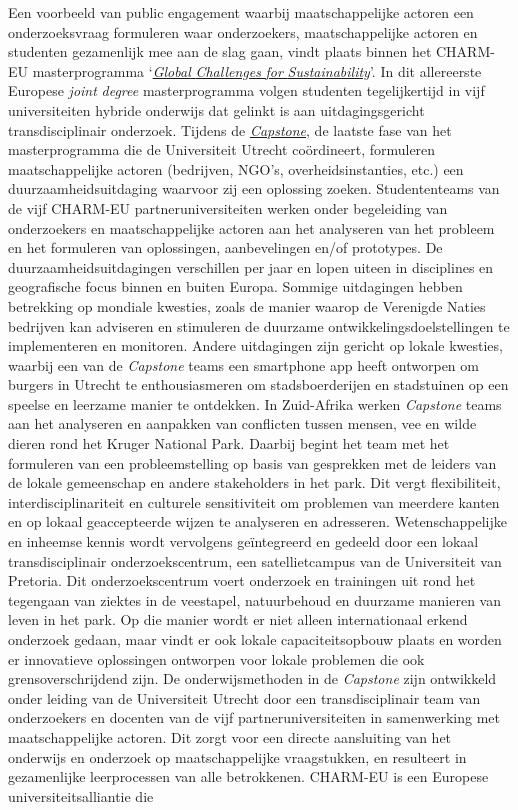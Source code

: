 \documentclass{jote-book}
\begin{document}
	\begin{bookboxnotitle}
		Een voorbeeld van public engagement waarbij maatschappelijke actoren een onderzoeksvraag formuleren waar onderzoekers, maatschappelijke actoren en studenten gezamenlijk mee aan de slag gaan, vindt plaats binnen het CHARM-EU masterprogramma ‘\href{https://www.charm-eu.eu/masters/globalchallenges}{\emph{Global }\emph{Challenges}\emph{ }\emph{for}\emph{ }\emph{Sustainability}}'. In dit allereerste Europese \emph{joint }\emph{degree} masterprogramma volgen studenten tegelijkertijd in vijf universiteiten hybride onderwijs dat gelinkt is aan uitdagingsgericht transdisciplinair onderzoek. Tijdens de \href{https://www.charm-eu.eu/capstonephase}{\emph{Capstone}}, de laatste fase van het masterprogramma die de Universiteit Utrecht coördineert, formuleren maatschappelijke actoren (bedrijven, NGO's, overheidsinstanties, etc.) een duurzaamheidsuitdaging waarvoor zij een oplossing zoeken. Studententeams van de vijf CHARM-EU partneruniversiteiten werken onder begeleiding van onderzoekers en maatschappelijke actoren aan het analyseren van het probleem en het formuleren van oplossingen, aanbevelingen en/of prototypes. De duurzaamheidsuitdagingen verschillen per jaar en lopen uiteen in disciplines en geografische focus binnen en buiten Europa. Sommige uitdagingen hebben betrekking op mondiale kwesties, zoals de manier waarop de Verenigde Naties bedrijven kan adviseren en stimuleren de duurzame ontwikkelingsdoelstellingen te implementeren en monitoren. Andere uitdagingen zijn gericht op lokale kwesties, waarbij een van de \emph{Capstone} teams een smartphone app heeft ontworpen om burgers in Utrecht te enthousiasmeren om stadsboerderijen en stadstuinen op een speelse en leerzame manier te ontdekken. In Zuid-Afrika werken \emph{Capstone} teams aan het analyseren en aanpakken van conflicten tussen mensen, vee en wilde dieren rond het Kruger National Park. Daarbij begint het team met het formuleren van een probleemstelling op basis van gesprekken met de leiders van de lokale gemeenschap en andere stakeholders in het park. Dit vergt flexibiliteit, interdisciplinariteit en culturele sensitiviteit om problemen van meerdere kanten en op lokaal geaccepteerde wijzen te analyseren en adresseren. Wetenschappelijke en inheemse kennis wordt vervolgens geïntegreerd en gedeeld door een lokaal transdisciplinair onderzoekscentrum, een satellietcampus van de Universiteit van Pretoria. Dit onderzoekscentrum voert onderzoek en trainingen uit rond het tegengaan van ziektes in de veestapel, natuurbehoud en duurzame manieren van leven in het park. Op die manier wordt er niet alleen internationaal erkend onderzoek gedaan, maar vindt er ook lokale capaciteitsopbouw plaats en worden er innovatieve oplossingen ontworpen voor lokale problemen die ook grensoverschrijdend zijn. De onderwijsmethoden in de \emph{Capstone} zijn ontwikkeld onder leiding van de Universiteit Utrecht door een transdisciplinair team van onderzoekers en docenten van de vijf partneruniversiteiten in samenwerking met maatschappelijke actoren. Dit zorgt voor een directe aansluiting van het onderwijs en onderzoek op maatschappelijke vraagstukken, en resulteert in gezamenlijke leerprocessen van alle betrokkenen. CHARM-EU is een Europese universiteitsalliantie die 
\end{bookboxnotitle}
\end{document}
